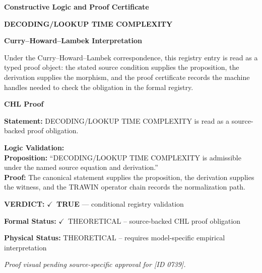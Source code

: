 \clearpage
\begingroup\tzpsupportsetup
\noindent\textbf{\fontsize{10.8pt}{12.8pt}\selectfont [ID 0739] Constructive Logic and Proof Certificate}\par
\noindent\textbf{\fontsize{10pt}{12pt}\selectfont DECODING/LOOKUP TIME COMPLEXITY}\par
\vspace{0.45em}
\begingroup
\footnotesize
\setlength{\parskip}{0.22em}
\setlength{\parindent}{0pt}
\noindent\textbf{Curry--Howard--Lambek Interpretation}\par
Under the Curry--Howard--Lambek correspondence, this registry entry is read as a typed proof
object: the stated source condition supplies the proposition, the derivation supplies the
morphism, and the proof certificate records the machine handles needed to check the obligation
in the formal registry.

\vspace{0.45em}
\noindent\textbf{CHL Proof}\par
\textbf{Statement:} DECODING/LOOKUP TIME COMPLEXITY is read as a source-backed proof obligation.

\textbf{Logic Validation:}\\
\textbf{Proposition:} ``DECODING/LOOKUP TIME COMPLEXITY is admissible under the named source equation and derivation.''\\
\textbf{Proof:} The canonical statement supplies the proposition, the derivation supplies the witness, and the TRAWIN operator chain records the normalization path.

\textbf{VERDICT:} \ensuremath{\checkmark}\ \textbf{TRUE} --- conditional registry validation

\textbf{Formal Status:} \ensuremath{\checkmark}\ THEORETICAL -- source-backed CHL proof obligation

\textbf{Physical Status:} THEORETICAL -- requires model-specific empirical interpretation
\par\vspace{0.45em}
\par
\vfill
\begingroup\footnotesize\itshape
Proof visual pending source-specific approval for [ID 0739].
\par\endgroup
\vfill
\endgroup
\endgroup

